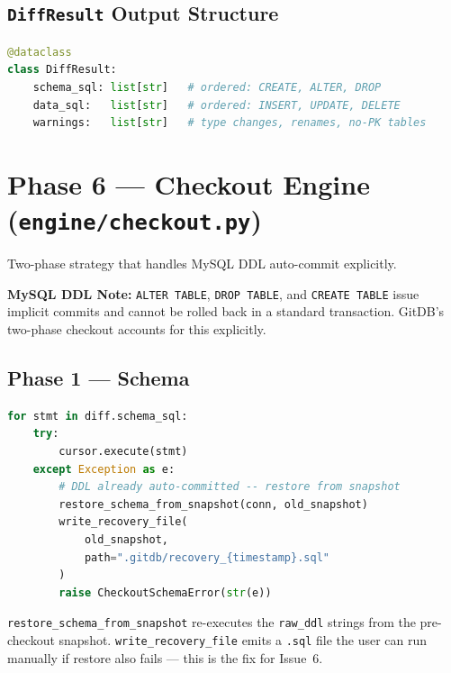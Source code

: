 \documentclass[12pt, a4paper]{article}
\begin{document}
\subsection{\texttt{DiffResult} Output Structure}

\begin{tcolorbox}[commandbox, title=\texttt{DiffResult} Dataclass]
\begin{lstlisting}[language=Python]
@dataclass
class DiffResult:
    schema_sql: list[str]   # ordered: CREATE, ALTER, DROP
    data_sql:   list[str]   # ordered: INSERT, UPDATE, DELETE
    warnings:   list[str]   # type changes, renames, no-PK tables
\end{lstlisting}
\end{tcolorbox}

\section{Phase 6 --- Checkout Engine (\texttt{engine/checkout.py})}

Two-phase strategy that handles MySQL DDL auto-commit explicitly.

\begin{tcolorbox}[warningbox]
\textbf{MySQL DDL Note:} \texttt{ALTER TABLE}, \texttt{DROP TABLE}, and
\texttt{CREATE TABLE} issue implicit commits and cannot be rolled back in a
standard transaction. GitDB's two-phase checkout accounts for this explicitly.
\end{tcolorbox}

\subsection{Phase 1 --- Schema}

\begin{tcolorbox}[commandbox, title=Phase 1 --- Schema Application with Recovery]
\begin{lstlisting}[language=Python]
for stmt in diff.schema_sql:
    try:
        cursor.execute(stmt)
    except Exception as e:
        # DDL already auto-committed -- restore from snapshot
        restore_schema_from_snapshot(conn, old_snapshot)
        write_recovery_file(
            old_snapshot,
            path=".gitdb/recovery_{timestamp}.sql"
        )
        raise CheckoutSchemaError(str(e))
\end{lstlisting}
\textcolor{codetext}{\small \texttt{restore\_schema\_from\_snapshot}
re-executes the \texttt{raw\_ddl} strings from the pre-checkout snapshot.
\texttt{write\_recovery\_file} emits a \texttt{.sql} file the user can
run manually if restore also fails --- this is the fix for Issue~6.}
\end{tcolorbox}
\end{document}
